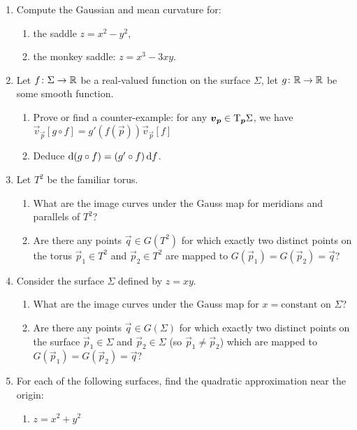 \begin{enumerate}
\item Compute the Gaussian and mean curvature for:
  \begin{enumerate}
  \item the saddle $z=x^{2}-y^{2}$,
  \item the monkey saddle: $z=x^{3}-3xy$.
  \end{enumerate}
\item Let $f\colon\Sigma\to\mathbb{R}$ be a real-valued function on the surface
  $\Sigma$, let $g\colon\mathbb{R}\to\mathbb{R}$ be some smooth function.
  \begin{enumerate}
  \item Prove or find a counter-example: for any
    $\boldsymbol{v}_{\boldsymbol{p}}\in\mathrm{T}_{\boldsymbol{p}}\Sigma$, we have $\vec{v}_{\vec{p}}[g\circ f] = g'(f(\vec{p}))\vec{v}_{\vec{p}}[f]$
  \item Deduce $\mathrm{d}(g\circ f) = (g'\circ f)\,\mathrm{d} f$.
  \end{enumerate}
\item Let $T^{2}$ be the familiar torus.
  \begin{enumerate}
  \item What are the image curves under
    the Gauss map for meridians and parallels of $T^{2}$?
  \item Are there any points $\vec{q}\in G(T^{2})$ for which exactly two
    distinct points on the torus $\vec{p}_{1}\in T^{2}$ and
    $\vec{p}_{2}\in T^{2}$ are mapped to $G(\vec{p}_{1})=G(\vec{p}_{2})=\vec{q}$?
  \end{enumerate}
\item Consider the surface $\Sigma$ defined by $z=xy$.
  \begin{enumerate}
  \item What are the image curves under
    the Gauss map for $x=\mbox{constant}$ on $\Sigma$?
  \item Are there any points $\vec{q}\in G(\Sigma)$ for which exactly two
    distinct points on the surface $\vec{p}_{1}\in\Sigma$ and
    $\vec{p}_{2}\in\Sigma$ (so $\vec{p}_{1}\neq\vec{p}_{2}$) which are mapped to $G(\vec{p}_{1})=G(\vec{p}_{2})=\vec{q}$?
  \end{enumerate}
\item For each of the following surfaces, find the quadratic
  approximation near the origin:
  \begin{enumerate}
  \item $z = x^{2}+y^{2}$

\end{enumerate}
\end{enumerate}
